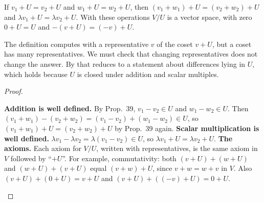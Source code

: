 \documentclass[10pt]{scrartcl}
\begin{document}
\begin{proposition*}
  If $v_1+U=v_2+U$ and $w_1+U=w_2+U$, then $(v_1+w_1)+U=(v_2+w_2)+U$ and $\lambda v_1+U=\lambda v_2+U$. With these operations $V/U$ is a vector space, with zero $0+U=U$ and $-(v+U)=(-v)+U$.
\end{proposition*}
\begin{ideabox}
  The definition computes with a representative $v$ of the coset $v+U$, but a coset has many representatives. We must check that changing representatives does not change the answer. By  that reduces to a statement about differences lying in $U$, which holds because $U$ is closed under addition and scalar multiples.
\end{ideabox}
\begin{proof}
  \begin{steps}
    \ii \textbf{Addition is well defined.} By Prop.~39, $v_1-v_2\in U$ and $w_1-w_2\in U$. Then $(v_1+w_1)-(v_2+w_2)=(v_1-v_2)+(w_1-w_2)\in U$, so $(v_1+w_1)+U=(v_2+w_2)+U$ by Prop.~39 again.
    \ii \textbf{Scalar multiplication is well defined.} $\lambda v_1-\lambda v_2=\lambda(v_1-v_2)\in U$, so $\lambda v_1+U=\lambda v_2+U$.
    \ii \textbf{The axioms.} Each axiom for $V/U$, written with representatives, is the same axiom in $V$ followed by ``$+U$''. For example, commutativity: both $(v+U)+(w+U)$ and $(w+U)+(v+U)$ equal $(v+w)+U$, since $v+w=w+v$ in $V$. Also $(v+U)+(0+U)=v+U$ and $(v+U)+((-v)+U)=0+U$.
  \end{steps}
\end{proof}
\end{document}
